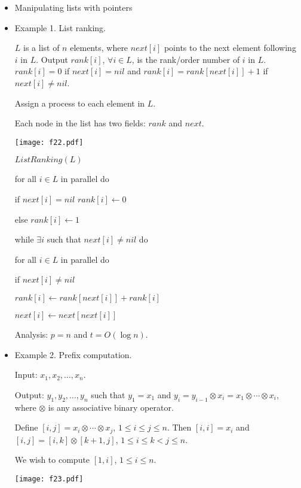 \documentclass{article}
\begin{document}
\begin{itemize}

\item Manipulating lists with pointers

\item Example 1. List ranking.

$L$ is a list of $n$ elements, where $next[i]$ points to the next element
following $i$ in $L$. Output $rank[i]$, $\forall i\in L$, is the rank/order
number of $i$ in $L$. $rank[i]=0$ if $next[i]=nil$ and
$rank[i]=rank[next[i]]+1$ if $next[i]\not=nil$.

Assign a process to each element in $L$.

Each node in the list has two fields: $rank$ and $next$.

\vskip 0.25cm
\begin{center}
\texttt{[image: f22.pdf]}
\end{center}

$ListRanking(L)$

\qquad for all $i\in L$ in parallel do

\qquad\qquad if $next[i]=nil$ $rank[i]\leftarrow 0$

\qquad\qquad else $rank[i]\leftarrow 1$

\qquad while $\exists i$ such that $next[i]\not=nil$ do

\qquad\qquad for all $i\in L$ in parallel do

\qquad\qquad\qquad if $next[i]\not=nil$

\qquad\qquad\qquad\qquad $rank[i]\leftarrow rank[next[i]]+rank[i]$

\qquad\qquad\qquad\qquad $next[i]\leftarrow next[next[i]]$

Analysis: $p=n$ and $t=O(\log n)$.

\item Example 2. Prefix computation.

Input: $x_1,x_2,\ldots,x_n$.

Output: $y_1,y_2,\ldots,y_n$ such that $y_1=x_1$ and 
$y_i=y_{i-1}\otimes x_i=x_1\otimes\cdots\otimes x_i$, where
$\otimes$ is any associative binary operator.

Define $[i,j]=x_i\otimes\cdots\otimes x_j$, $1\le i\le j\le n$.
Then $[i,i]=x_i$ and $[i,j]=[i,k]\otimes [k+1,j]$, $1\le i\le k<j\le n$.

We wish to compute $[1,i]$, $1\le i\le n$.

\vskip 0.25cm
\begin{center}
\texttt{[image: f23.pdf]}
\end{center}


\end{itemize}
\end{document}
